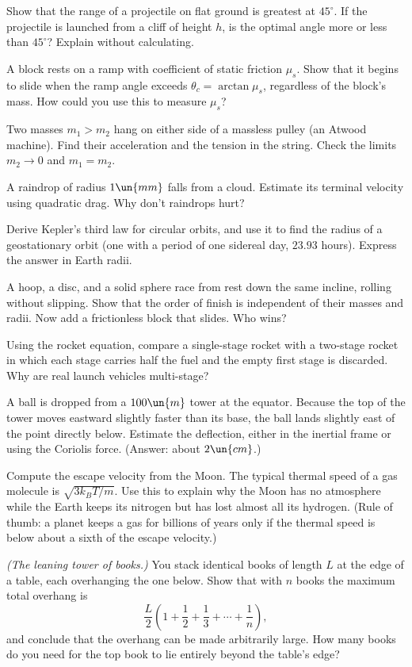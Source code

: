 \begin{problems}
\core Show that the range of a projectile on flat ground is greatest at $45^\circ$. If the projectile is launched from a cliff of height $h$, is the optimal angle more or less than $45^\circ$? Explain without calculating.

 A block rests on a ramp with coefficient of static friction $\mu_s$. Show that it begins to slide when the ramp angle exceeds $\theta_c = \arctan\mu_s$, regardless of the block's mass. How could you use this to measure $\mu_s$?

 Two masses $m_1 > m_2$ hang on either side of a massless pulley (an Atwood machine). Find their acceleration and the tension in the string. Check the limits $m_2\to0$ and $m_1=m_2$.

 A raindrop of radius $1\un{mm}$ falls from a cloud. Estimate its terminal velocity using quadratic drag. Why don't raindrops hurt?

\core Derive Kepler's third law for circular orbits, and use it to find the radius of a geostationary orbit (one with a period of one sidereal day, $23.93$ hours). Express the answer in Earth radii.

\core A hoop, a disc, and a solid sphere race from rest down the same incline, rolling without slipping. Show that the order of finish is independent of their masses and radii. Now add a frictionless block that slides. Who wins?

 Using the rocket equation, compare a single-stage rocket with a two-stage rocket in which each stage carries half the fuel and the empty first stage is discarded. Why are real launch vehicles multi-stage?

 A ball is dropped from a $100\un{m}$ tower at the equator. Because the top of the tower moves eastward slightly faster than its base, the ball lands slightly east of the point directly below. Estimate the deflection, either in the inertial frame or using the Coriolis force. (Answer: about $2\un{cm}$.)

 Compute the escape velocity from the Moon. The typical thermal speed of a gas molecule is $\sqrt{3k_BT/m}$. Use this to explain why the Moon has no atmosphere while the Earth keeps its nitrogen but has lost almost all its hydrogen. (Rule of thumb: a planet keeps a gas for billions of years only if the thermal speed is below about a sixth of the escape velocity.)

\core \emph{(The leaning tower of books.)} You stack identical books of length $L$ at the edge of a table, each overhanging the one below. Show that with $n$ books the maximum total overhang is
\[
  \frac{L}{2}\left(1 + \frac12 + \frac13 + \cdots + \frac1n\right),
\]
and conclude that the overhang can be made arbitrarily large. How many books do you need for the top book to lie entirely beyond the table's edge?


\end{problems}
